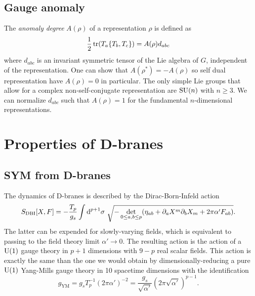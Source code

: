     \subsection{Gauge anomaly}\label{sec:anomalies}
        
        The \emph{anomaly degree} $A(\rho)$ of a representation $\rho$ is defined as
        \begin{equation}
            \frac{1}{2}\tr(T_a\{T_b,T_c\})=A(\rho)d_{abc}
        \end{equation}
        where $d_{abc}$ is an invariant symmetric tensor of the Lie algebra of $G$, independent of the representation. One can show that $A(\rho^*)=-A(\rho)$ so self dual representation have $A(\rho)=0$ in particular. The only simple Lie groups that allow for a complex non-self-conjugate representation are $\text{SU}(n)$ with $n\geq3$. We can normalize $d_{abc}$ such that $A(\rho)=1$ for the fundamental $n$-dimensional representations.
    
\section{Properties of D-branes}

    \subsection{SYM from D-branes}

        The dynamics of D-branes is described by the Dirac-Born-Infeld action
        \begin{equation}
            S_{\text{DBI}}[X,F] = -\frac{T_p}{g_s}\int\text{d}^{p+1}\sigma~\sqrt{-\det\limits_{0\leq a,b\leq p}(\eta_{ab}+\partial_a X^m\partial_b X_m+2\pi\alpha'F_{ab})}.
        \end{equation}
        The latter can be expended for slowly-varying ﬁelds, which is equivalent to passing to the ﬁeld theory limit $\alpha'\to0$. The resulting action is the action of a $\text{U}(1)$ gauge theory in $p+1$ dimensions with $9-p$ real scalar fields. This action is exactly the same than the one we would obtain by dimensionally-reducing a pure $\text{U}(1)$ Yang-Mills gauge theory in 10 spacetime dimensions with the identification
        \begin{equation}
            g_{\text{YM}}=g_sT^{-1}_p(2\pi\alpha')^{-2}=\frac{g_s}{\sqrt{\alpha'}}(2\pi\sqrt{\alpha'})^{p-1}.
        \end{equation}

